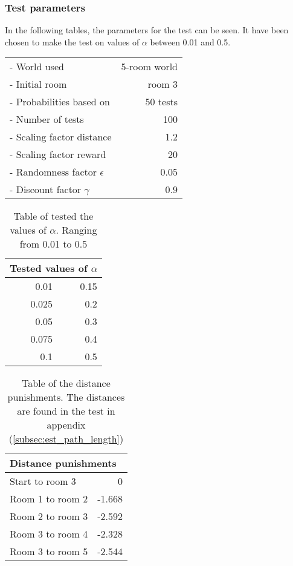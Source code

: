 \documentclass[../Head/Main.tex]{subfiles}
\begin{document}
\subsubsection*{Test parameters}
In the following tables, the parameters for the test can be seen. It have been chosen to make the test on values of $\alpha$ between 0.01 and 0.5.\\
\begin{minipage}[c]{0.35\textwidth}
	\begin{tabular}{l r}
	- World used                   & 5-room world\\
	- Initial room                 & room 3\\	
	- Probabilities based on       & 50 tests\\	
	- Number of tests              & 100\\
	- Scaling factor distance      & 1.2\\
	- Scaling factor reward        & 20\\
	- Randomness factor $\epsilon$ & 0.05\\
	- Discount factor $\gamma$     & 0.9\\
	\end{tabular}
\end{minipage}	
\hfill
\begin{minipage}[c]{0.2\textwidth}
	\begin{table}[H]
		\centering
		\begin{tabular}{r r}
		\hline
		\multicolumn{2}{l}{\textbf{Tested values of $\alpha$}}\\ 			\hline
		0.01   & 0.15\\
		0.025  & 0.2\\
		0.05   & 0.3\\
		0.075  & 0.4\\
		0.1    & 0.5\\
		\hline
		\end{tabular}
		\caption{Table of tested the values of $\alpha$. Ranging from 0.01 to 0.5}
		\label{tab:test_alpha}
	\end{table}
\end{minipage}
\hfill
\begin{minipage}[c]{0.3\textwidth}
	\begin{table}[H]
	\centering
	\begin{tabular}{l r}
		\hline
		\multicolumn{2}{l}{\textbf{Distance punishments}}\\ 			\hline
		Start to room 3   & 0\\
		Room 1 to room 2  & -1.668\\
		Room 2 to room 3  & -2.592\\
		Room 3 to room 4  & -2.328\\
		Room 3 to room 5  & -2.544\\
		\hline
	\end{tabular}
	\caption{Table of the distance punishments. The distances are found in the test in appendix (\ref{subsec:est_path_length})}
	\label{tab:distance_punishment_5_rooms_1}
\end{table}
\end{minipage}
\end{document}
